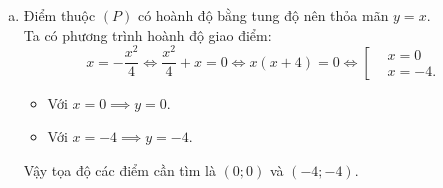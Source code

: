 \begin{bt}
{\begin{enumerate}[a)]
\begin{center}
    \end{center}
    \item Điểm thuộc $(P)$ có hoành độ bằng tung độ nên thỏa mãn $y = x$.\\
    Ta có phương trình hoành độ giao điểm:
    $$x = -\dfrac{x^2}{4} \iff \dfrac{x^2}{4} + x = 0 \iff x(x + 4) = 0 \iff \left[\begin{aligned} &x = 0 \\ &x = -4. \end{aligned}\right.$$
    \begin{itemize}
        \item Với $x = 0 \implies y = 0$.
        \item Với $x = -4 \implies y = -4$.
    \end{itemize}
    Vậy tọa độ các điểm cần tìm là $(0;0)$ và $(-4;-4)$.
\end{enumerate}
}
\end{bt}

